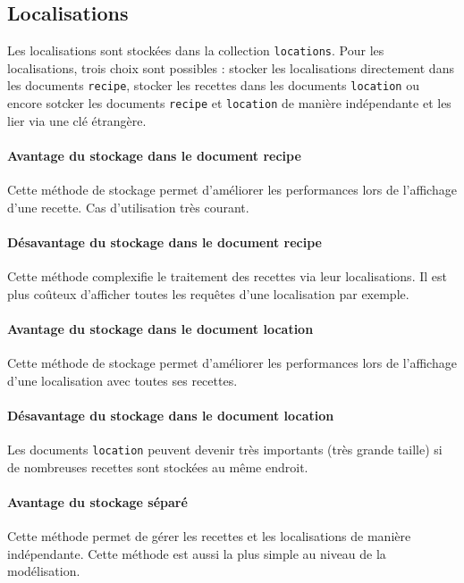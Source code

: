 	\subsection{Localisations}

		Les localisations sont stockées dans la collection \verb|locations|. Pour les localisations, trois choix sont possibles : stocker les localisations directement dans les documents \verb|recipe|, stocker les recettes dans les documents \verb|location| ou encore sotcker les documents \verb|recipe| et \verb|location| de manière indépendante et les lier via une clé étrangère.

		\paragraph{Avantage du stockage dans le document recipe}%
			Cette méthode de stockage permet d'améliorer les performances lors de l'affichage d'une recette. Cas d'utilisation très courant.

		\paragraph{Désavantage du stockage dans le document recipe}%
			Cette méthode complexifie le traitement des recettes via leur localisations. Il est plus coûteux d'afficher toutes les requêtes d'une localisation par exemple.

		\paragraph{Avantage du stockage dans le document location}%
			Cette méthode de stockage permet d'améliorer les performances lors de l'affichage d'une localisation avec toutes ses recettes.

		\paragraph{Désavantage du stockage dans le document location}%
			Les documents \verb|location| peuvent devenir très importants (très grande taille) si de nombreuses recettes sont stockées au même endroit.

		\paragraph{Avantage du stockage séparé}%
			Cette méthode permet de gérer les recettes et les localisations de manière indépendante. Cette méthode est aussi la plus simple au niveau de la modélisation.

